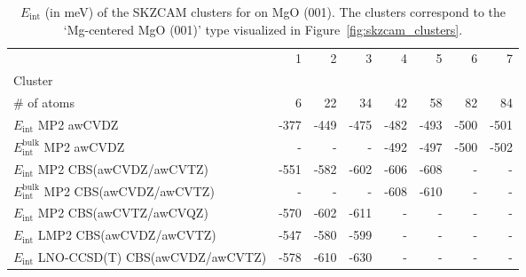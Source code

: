 \begin{table}
\caption{\label{tab:system_eint_mgo_nh3}$E_\textrm{int}$ (in meV) of the SKZCAM clusters for  on MgO (001). The clusters correspond to the `Mg-centered MgO (001)' type visualized in Figure~\ref{fig:skzcam_clusters}.}
\begin{adjustbox}{center,max width=1.4\textwidth}
\begin{tabular}{lrrrrrrr}
\toprule
 & 1 & 2 & 3 & 4 & 5 & 6 & 7 \\ 
Cluster &  &  &  &  &  &  &  \\
\midrule
\# of atoms & 6 & 22 & 34 & 42 & 58 & 82 & 84 \\
$E_\textrm{int}$ MP2 awCVDZ & -377 & -449 & -475 & -482 & -493 & -500 & -501 \\
$E_\textrm{int}^\textrm{bulk}$ MP2 awCVDZ & - & - & - & -492 & -497 & -500 & -502 \\
$E_\textrm{int}$ MP2 CBS(awCVDZ/awCVTZ) & -551 & -582 & -602 & -606 & -608 & - & - \\
$E_\textrm{int}^\textrm{bulk}$ MP2 CBS(awCVDZ/awCVTZ) & - & - & - & -608 & -610 & - & - \\
$E_\textrm{int}$ MP2 CBS(awCVTZ/awCVQZ) & -570 & -602 & -611 & - & - & - & - \\
$E_\textrm{int}$ LMP2 CBS(awCVDZ/awCVTZ) & -547 & -580 & -599 & - & - & - & - \\
$E_\textrm{int}$ LNO-CCSD(T) CBS(awCVDZ/awCVTZ) & -578 & -610 & -630 & - & - & - & - \\
\bottomrule
\end{tabular}
\end{adjustbox}
\end{table}


